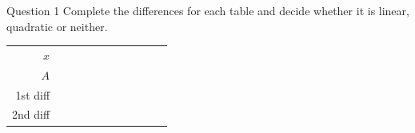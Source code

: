 \documentclass[11pt]{article}
\begin{document}
\begin{qbox}{Question 1}
Complete the differences for each table and decide whether it is linear, quadratic or neither.
\begin{center}\renewcommand{\arraystretch}{1.15}\setlength{\tabcolsep}{2pt}\begin{tabular}{r|>{\centering\arraybackslash}p{0.62cm}>{\centering\arraybackslash}p{0.62cm}>{\centering\arraybackslash}p{0.62cm}>{\centering\arraybackslash}p{0.62cm}>{\centering\arraybackslash}p{0.62cm}>{\centering\arraybackslash}p{0.62cm}>{\centering\arraybackslash}p{0.62cm}>{\centering\arraybackslash}p{0.62cm}>{\centering\arraybackslash}p{0.62cm}>{\centering\arraybackslash}p{0.62cm}}
$x$ & \multicolumn{2}{c}{\colorbox{iagreen}{\makebox[1.12cm]{\strut \color{white}\bfseries $1$}}} & \multicolumn{2}{c}{\colorbox{iagreen}{\makebox[1.12cm]{\strut \color{white}\bfseries $2$}}} & \multicolumn{2}{c}{\colorbox{iagreen}{\makebox[1.12cm]{\strut \color{white}\bfseries $3$}}} & \multicolumn{2}{c}{\colorbox{iagreen}{\makebox[1.12cm]{\strut \color{white}\bfseries $4$}}} & \multicolumn{2}{c}{\colorbox{iagreen}{\makebox[1.12cm]{\strut \color{white}\bfseries $5$}}} \\[2pt]
$A$ & \multicolumn{2}{c}{\colorbox{keybg}{\makebox[1.12cm]{\strut $2$}}} & \multicolumn{2}{c}{\colorbox{keybg}{\makebox[1.12cm]{\strut $5$}}} & \multicolumn{2}{c}{\colorbox{keybg}{\makebox[1.12cm]{\strut $10$}}} & \multicolumn{2}{c}{\colorbox{keybg}{\makebox[1.12cm]{\strut $17$}}} & \multicolumn{2}{c}{\colorbox{keybg}{\makebox[1.12cm]{\strut $26$}}} \\[2pt]
\textcolor{exblue}{\scriptsize 1st diff} & & \multicolumn{2}{c}{\fbox{\makebox[0.94cm]{\strut}}} & \multicolumn{2}{c}{\fbox{\makebox[0.94cm]{\strut}}} & \multicolumn{2}{c}{\fbox{\makebox[0.94cm]{\strut}}} & \multicolumn{2}{c}{\fbox{\makebox[0.94cm]{\strut}}} & \\[2pt]
\textcolor{qorange}{\scriptsize 2nd diff} & & & \multicolumn{2}{c}{\fbox{\makebox[0.94cm]{\strut}}} & \multicolumn{2}{c}{\fbox{\makebox[0.94cm]{\strut}}} & \multicolumn{2}{c}{\fbox{\makebox[0.94cm]{\strut}}} & & \\
\end{tabular}\end{center}
\begin{center}\renewcommand{\arraystretch}{1.15}\setlength{\tabcolsep}{2pt}\begin{tabular}{r|>{\centering\arraybackslash}p{0.62cm}>{\centering\arraybackslash}p{0.62cm}>{\centering\arraybackslash}p{0.62cm}>{\centering\arraybackslash}p{0.62cm}>{\centering\arraybackslash}p{0.62cm}>{\centering\arraybackslash}p{0.62cm}>{\centering\arraybackslash}p{0.62cm}>{\centering\arraybackslash}p{0.62cm}>{\centering\arraybackslash}p{0.62cm}>{\centering\arraybackslash}p{0.62cm}}

\end{tabular}
\end{center}
\end{qbox}
\end{document}
